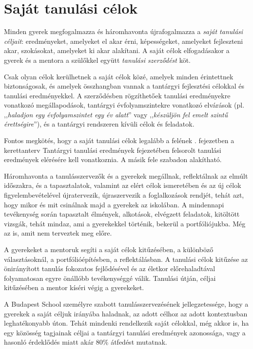 \section{Saját tanulási célok}
\label{sec:tanulasi_celok}

Minden gyerek megfogalmazza és háromhavonta újrafogalmazza a \emph{saját
      tanulási céljait}: eredményeket, amelyeket el akar érni, képességeket,
amelyeket fejleszteni akar, szokásokat, amelyeket ki akar alakítani. A saját
célok elfogadásakor a gyerek és a mentora a szülőkkel együtt \emph{tanulási
      szerződést} köt.

Csak olyan célok kerülhetnek a saját célok közé, amelyek
minden érintettnek biztonságosak, és amelyek összhangban vannak a tantárgyi
fejlesztési célokkal és tanulási eredményekkel. A szerződésben rögzíthetőek
tanulási eredményekre
vonatkozó megállapodások,
tantárgyi évfolyamszintekre vonatkozó elvárások (pl. ,,\emph{haladjon egy
      évfolyamszintet egy év alatt}'' vagy ,,\emph{készüljön fel emelt szintű
      érettségire}''), és a tantárgyi rendszeren kívüli célok és
feladatok.

Fontos megkötés, hogy a saját tanulási célok legalább a felének
\ifkerettanterv
      . fejezetben
\else
      a kerettanterv Tantárgyi tanulási eredmények fejezetében
\fi
felsorolt tanulási eredmények elérésére kell vonatkoznia. A másik
fele szabadon alakítható.

Háromhavonta a tanulásszervezők és a gyerekek megállnak, reflektálnak az elmúlt
időszakra, és a tapasztalatok, valamint az elért célok ismeretében és az új
célok figyelembevételével újratervezik, újraszervezik a foglalkozások rendjét,
tehát azt, hogy mikor és mit csinálnak majd a gyerekek az iskolában.
A mindennapi tevékenység során tapasztalt élmények, alkotások, elvégzett
feladatok, kitöltött vizsgák, tehát mindaz, ami a gyerekekkel történik, bekerül
a portfóliójukba. Még az is, amit nem terveztek meg előre.

A gyerekeket a mentoruk segíti a saját célok kitűzésében, a különböző
választásoknál, a portfólióépítésben, a reflektálásban. A tanulási célok
kitűzése az önirányított tanulás fokozatos fejlődésével és az életkor
előrehaladtával folyamatosan egyre önállóbb tevékenységgé válik. Tanulási
útján, céljai kitűzésében a mentor kíséri végig a gyerekeket.

A Budapest School személyre szabott tanulásszervezésének jellegzetessége, hogy
a gyerekek a saját céljuk irányába haladnak, az adott célhoz az adott
kontextusban leghatékonyabb úton. Tehát mindenki rendelkezik saját célokkal,
még akkor is, ha egy közösség tagjainak céljai a tantárgyi tanulási eredmények
azonossága, vagy a hasonló érdeklődés miatt akár  80\% átfedést mutatnak.

